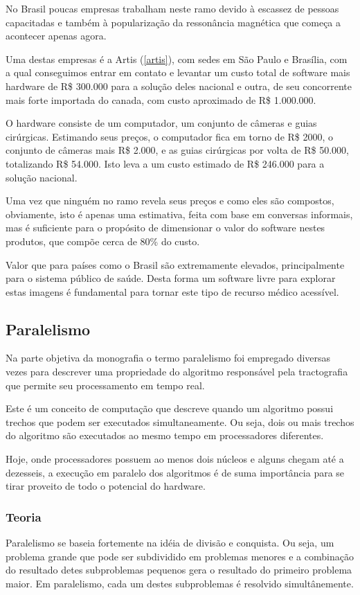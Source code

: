   No Brasil poucas empresas trabalham neste ramo devido à escassez de pessoas capacitadas e também à popularização da ressonância magnética que começa a acontecer apenas agora.
  
  Uma destas empresas é a Artis (\ref{artis}), com sedes em São Paulo e Brasília, com a qual conseguimos entrar em contato e levantar um custo total de software mais hardware de R\$ 300.000 para a solução deles nacional e outra, de seu concorrente mais forte importada do canada, com custo aproximado de R\$ 1.000.000.
  
  O hardware consiste de um computador, um conjunto de câmeras e guias cirúrgicas. Estimando seus preços, o computador fica em torno de R\$ 2000, o conjunto de câmeras mais R\$ 2.000, e as guias cirúrgicas por volta de R\$ 50.000, totalizando R\$ 54.000. Isto leva a um custo estimado de R\$ 246.000 para a solução nacional.
  
  Uma vez que ninguém no ramo revela seus preços e como eles são compostos, obviamente, isto é apenas uma estimativa, feita com base em conversas informais, mas é suficiente para o propósito de dimensionar o valor do software nestes produtos, que compõe cerca de 80\% do custo.
  
  Valor que para países como o Brasil são extremamente elevados, principalmente para o sistema público de saúde. Desta forma um software livre para explorar estas imagens é fundamental para tornar este tipo de recurso médico acessível.
  
  \subsection{Paralelismo}
    Na parte objetiva da monografia o termo paralelismo foi empregado diversas vezes para descrever uma propriedade do algoritmo responsável pela tractografia que permite seu processamento em tempo real.
    
    Este é um conceito de computação que descreve quando um algoritmo possui trechos que podem ser executados simultaneamente. Ou seja, dois ou mais trechos do algoritmo são executados ao mesmo tempo em processadores diferentes.
    
    Hoje, onde processadores possuem ao menos dois núcleos e alguns chegam até a dezesseis, a execução em paralelo dos algoritmos é de suma importância para se tirar proveito de todo o potencial do hardware.
  
    \subsubsection{Teoria}
    Paralelismo se baseia fortemente na idéia de divisão e conquista. Ou seja, um problema grande que pode ser subdividido em problemas menores e a combinação do resultado detes subproblemas pequenos gera o resultado do primeiro problema maior. Em paralelismo, cada um destes subproblemas é resolvido simultânemente.
    
